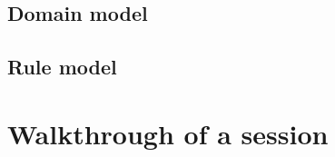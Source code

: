 \documentclass{article}
\begin{document}
\subsection{Domain model}
\subsection{Rule model}
\section{Walkthrough of a session} 
\end{document}

